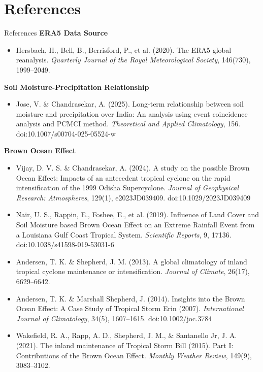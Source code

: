 \documentclass[10pt, aspectratio=169,t,xcolor=table]{beamer}
\begin{document}
\section{References}
\begin{frame}{References}
	\vspace{-0.2cm}
	\footnotesize
	\textbf{ERA5 Data Source}
	\begin{itemize}\scriptsize
		\item Hersbach, H., Bell, B., Berrisford, P., et al. (2020). The ERA5 global reanalysis. \textit{Quarterly Journal of the Royal Meteorological Society}, 146(730), 1999–2049.
	\end{itemize}

	\vspace{-0.1cm}
	\footnotesize
	\textbf{Soil Moisture-Precipitation Relationship}
	\begin{itemize}\scriptsize
		\item Jose, V. \& Chandrasekar, A. (2025). Long-term relationship between soil moisture and precipitation over India: An analysis using event coincidence analysis and PCMCI method. \textit{Theoretical and Applied Climatology}, 156. doi:10.1007/s00704-025-05524-w
	\end{itemize}

	\vspace{-0.1cm}
	\footnotesize
	\textbf{Brown Ocean Effect}
	\begin{itemize}\scriptsize
		\item Vijay, D. V. S. \& Chandrasekar, A. (2024). A study on the possible Brown Ocean Effect: Impacts of an antecedent tropical cyclone on the rapid intensification of the 1999 Odisha Supercyclone. \textit{Journal of Geophysical Research: Atmospheres}, 129(1), e2023JD039409. doi:10.1029/2023JD039409
		\item Nair, U. S., Rappin, E., Foshee, E., et al. (2019). Influence of Land Cover and Soil Moisture based Brown Ocean Effect on an Extreme Rainfall Event from a Louisiana Gulf Coast Tropical System. \textit{Scientific Reports}, 9, 17136. doi:10.1038/s41598-019-53031-6
		\item Andersen, T. K. \& Shepherd, J. M. (2013). A global climatology of inland tropical cyclone maintenance or intensification. \textit{Journal of Climate}, 26(17), 6629–6642.
		\item Andersen, T. K. \& Marshall Shepherd, J. (2014). Insights into the Brown Ocean Effect: A Case Study of Tropical Storm Erin (2007). \textit{International Journal of Climatology}, 34(5), 1607–1615. doi:10.1002/joc.3784
		\item Wakefield, R. A., Rapp, A. D., Shepherd, J. M., \& Santanello Jr, J. A. (2021). The inland maintenance of Tropical Storm Bill (2015). Part I: Contributions of the Brown Ocean Effect. \textit{Monthly Weather Review}, 149(9), 3083–3102.
	\end{itemize}
\end{frame}
\end{document}
